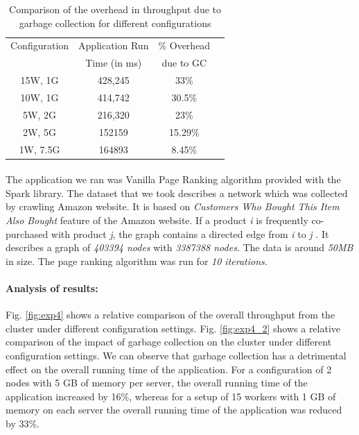 \begin{table}[h!]
\begin{tabular}{| c | c | c | c |}
\hline
Configuration  & Application Run  &  \% Overhead  \\ 
& Time (in ms) & due to GC \\ \hline
15W, 1G & 428,245  & 33\% \\ \hline
10W, 1G & 414,742 &  30.5\% \\ \hline
5W, 2G & 216,320 & 23\%  \\ \hline
2W, 5G & 152159 & 15.29\% \\ \hline
1W, 7.5G & 164893 & 8.45\% \\ \hline
\end{tabular}
\caption{Comparison of the overhead in throughput due to garbage collection for different configurations}
\label{tab:table1}
\end{table}

\paragraph{}
The application we ran was Vanilla Page Ranking algorithm provided with the Spark library. The dataset that we took describes a network which was collected by crawling Amazon website. It is based on \textit{Customers Who Bought This Item Also Bought} feature of the Amazon website. If a product \textit{i} is frequently co-purchased with product \textit{j}, the graph contains a directed edge from \textit{i} to \textit{j} \cite{leskovec2007dynamics}. It describes a graph of \textit{403394 nodes} with \textit{3387388 nodes}. The data is around \textit{50MB} in size. The page ranking algorithm was run for \textit{10 iterations}. 

\paragraph{Analysis of results:}
Fig. \ref{fig:exp4} shows a relative comparison of the overall throughput from the cluster under different configuration settings. Fig. \ref{fig:exp4_2} shows a relative comparison of the impact of garbage collection on the cluster under different configuration settings. We can observe that garbage collection has a detrimental effect on the  overall running time of the application. For a configuration of 2 nodes with 5 GB of memory per server, the overall running time of the application increased by 16\%, whereas for a setup of 15 workers with 1 GB of memory on each server the overall running time of the application was reduced by 33\%. 

